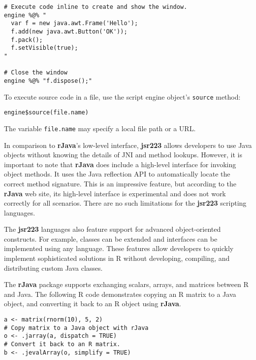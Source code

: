 \singlespace
\begin{verbatim}
# Execute code inline to create and show the window.
engine %@% "
  var f = new java.awt.Frame('Hello');
  f.add(new java.awt.Button('OK'));
  f.pack();
  f.setVisible(true);
"

# Close the window
engine %@% "f.dispose();"
\end{verbatim}
\doublespace
To execute source code in a file, use the script engine object's \texttt{source} method:
\begin{verbatim}
engine$source(file.name)
\end{verbatim}
The variable \texttt{file.name} may specify a local file path or a URL. %

In comparison to \textbf{rJava}'s low-level interface, \textbf{jsr223} allows developers to use Java objects without knowing the details of JNI and method lookups. However, it is important to note that \textbf{rJava} does include a high-level interface for invoking object methods. It uses the Java reflection API to automatically locate the correct method signature. This is an impressive feature, but according to the \textbf{rJava} web site, its high-level interface is experimental and does not work correctly for all scenarios. There are no such limitations for the \textbf{jsr223} scripting languages.

The \textbf{jsr223} languages also feature support for advanced object-oriented constructs. For example, classes can be extended and interfaces can be implemented using any language. These features allow developers to quickly implement sophisticated solutions in R without developing, compiling, and distributing custom Java classes.

The \textbf{rJava} package supports exchanging scalars, arrays, and matrices between R and Java. The following R code demonstrates copying an R matrix to a Java object, and converting it back to an R object using \textbf{rJava}.

\singlespace
\begin{verbatim}
a <- matrix(rnorm(10), 5, 2)
# Copy matrix to a Java object with rJava
o <- .jarray(a, dispatch = TRUE)
# Convert it back to an R matrix.
b <- .jevalArray(o, simplify = TRUE)
\end{verbatim}
\doublespace

